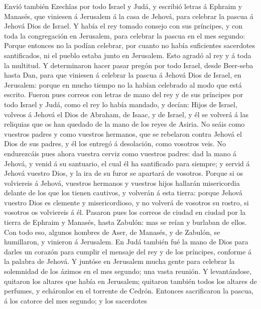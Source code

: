  Envió también Ezechîas por todo Israel y Judá, y escribió
letras á Ephraim y Manasés, que viniesen á Jerusalem á la casa de
Jehová, para celebrar la pascua á Jehová Dios de Israel. 
Y había el rey tomado consejo con sus príncipes, y con toda la
congregación en Jerusalem, para celebrar la pascua en el mes segundo:
 Porque entonces no la podían celebrar, por cuanto no
había suficientes sacerdotes santificados, ni el pueblo estaba junto en
Jerusalem.  Esto agradó al rey y á toda la multitud.
 Y determinaron hacer pasar pregón por todo Israel, desde
Beer-seba hasta Dan, para que viniesen á celebrar la pascua á Jehová
Dios de Israel, en Jerusalem: porque en mucho tiempo no la habían
celebrado al modo que está escrito.  Fueron pues correos
con letras de mano del rey y de sus príncipes por todo Israel y Judá,
como el rey lo había mandado, y decían: Hijos de Israel, volveos á
Jehová el Dios de Abraham, de Isaac, y de Israel, y él se volverá á las
reliquias que os han quedado de la mano de los reyes de Asiria.
 No seáis como vuestros padres y como vuestros hermanos,
que se rebelaron contra Jehová el Dios de sus padres, y él los entregó á
desolación, como vosotros veis.  No endurezcáis pues ahora
vuestra cerviz como vuestros padres: dad la mano á Jehová, y venid á su
santuario, el cual él ha santificado para siempre; y servid á Jehová
vuestro Dios, y la ira de su furor se apartará de vosotros.
 Porque si os volviereis á Jehová, vuestros hermanos y
vuestros hijos hallarán misericordia delante de los que los tienen
cautivos, y volverán á esta tierra: porque Jehová vuestro Dios es
clemente y misericordioso, y no volverá de vosotros su rostro, si
vosotros os volviereis á él.  Pasaron pues los correos de
ciudad en ciudad por la tierra de Ephraim y Manasés, hasta Zabulón: mas
se reían y burlaban de ellos.  Con todo eso, algunos
hombres de Aser, de Manasés, y de Zabulón, se humillaron, y vinieron á
Jerusalem.  En Judá también fué la mano de Dios para
darles un corazón para cumplir el mensaje del rey y de los príncipes,
conforme á la palabra de Jehová.  Y juntóse en Jerusalem
mucha gente para celebrar la solemnidad de los ázimos en el mes segundo;
una vasta reunión.  Y levantándose, quitaron los altares
que había en Jerusalem; quitaron también todos los altares de perfumes,
y echáronlos en el torrente de Cedrón.  Entonces
sacrificaron la pascua, á los catorce del mes segundo; y los sacerdotes
